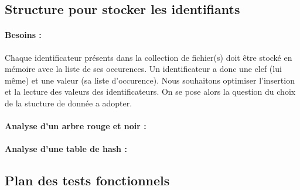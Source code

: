 \documentclass{article}
\begin{document}
\subsection{Structure pour stocker les identifiants}

\paragraph{Besoins :}
Chaque identificateur présents dans la collection de fichier(s) doit être stocké en mémoire avec la liste de ses occurences. Un identificateur a donc une clef (lui même) et une valeur (sa liste d'occurence). Nous souhaitons optimiser l'insertion et la lecture des valeurs des identificateurs. On se pose alors la question du choix de la stucture de donnée a adopter.


\paragraph{Analyse d'un arbre rouge et noir :}


\paragraph{Analyse d'une table de hash :}

\paragraph{}
 
\subsection{Plan des tests fonctionnels}
\end{document}
